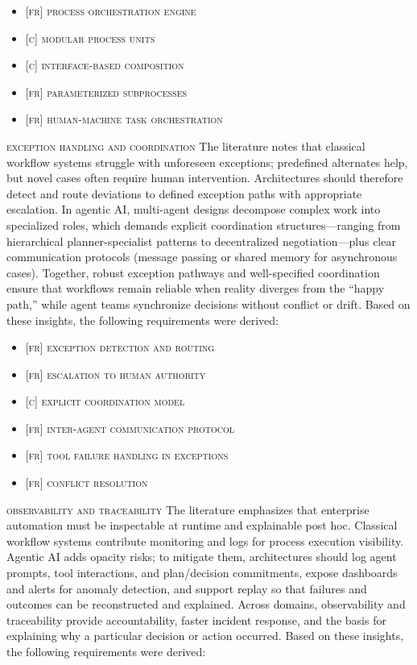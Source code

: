 \begin{itemize}
  \item \textsc{[fr] process orchestration engine}
  \item \textsc{[c] modular process units}
  \item \textsc{[c] interface-based composition}
  \item \textsc{[fr] parameterized subprocesses}
  \item \textsc{[fr] human-machine task orchestration}
\end{itemize}

\noindent \textsc{exception handling and coordination} \quad The literature notes that classical workflow systems struggle with unforeseen exceptions; predefined alternates help, but novel cases often require human intervention. Architectures should therefore detect and route deviations to defined exception paths with appropriate escalation. In agentic AI, multi-agent designs decompose complex work into specialized roles, which demands explicit coordination structures—ranging from hierarchical planner-specialist patterns to decentralized negotiation—plus clear communication protocols (message passing or shared memory for asynchronous cases). Together, robust exception pathways and well-specified coordination ensure that workflows remain reliable when reality diverges from the “happy path,” while agent teams synchronize decisions without conflict or drift. Based on these insights, the following requirements were derived:

\begin{itemize}
  \item \textsc{[fr] exception detection and routing}
  \item \textsc{[fr] escalation to human authority}
  \item \textsc{[c] explicit coordination model}
  \item \textsc{[fr] inter-agent communication protocol}
  \item \textsc{[fr] tool failure handling in exceptions}
  \item \textsc{[fr] conflict resolution}
\end{itemize}

\noindent \textsc{observability and traceability} \quad The literature emphasizes that enterprise automation must be inspectable at runtime and explainable post hoc. Classical workflow systems contribute monitoring and logs for process execution visibility. Agentic AI adds opacity risks; to mitigate them, architectures should log agent prompts, tool interactions, and plan/decision commitments, expose dashboards and alerts for anomaly detection, and support replay so that failures and outcomes can be reconstructed and explained. Across domains, observability and traceability provide accountability, faster incident response, and the basis for explaining why a particular decision or action occurred. Based on these insights, the following requirements were derived:

